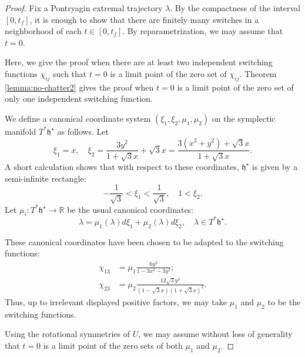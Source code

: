 \documentclass{article}
\theoremstyle{remark}
\newcommand{\ring}[1]{\mathbb{#1}}
\def\hstar{{\mathfrak h}^\star}
\begin{document}
\begin{proof} Fix a Pontryagin extremal trajectory $\lambda$.  By the
  compactness of the interval $[0,t_f]$, it is enough to show that
  there are finitely many switches in a neighborhood of each $t\in
  [0,t_f]$.  By reparametrization, we may assume that $t=0$.

  Here, we give the proof when there are at least two independent
  switching functions $\chi_{ij}$ such that $t=0$ is a limit point
  of the zero set of $\chi_{ij}$.  Theorem
  \ref{lemma:no-chatter2} gives the proof when $t=0$ is a limit
  point of the zero set of only one independent
  switching function.


We define a canonical coordinate system $(\xi_1,\xi_2,\mu_1,\mu_2)$ on
the symplectic manifold $T^*\hstar$ as follows.  Let
\[
\xi_1 = x,\quad \xi_2 =  \frac{3 y^2}{1 + \sqrt{3} x} + \sqrt{3} x = 
\frac{3 (x^2+y^2) + \sqrt{3} x}{1 + \sqrt{3} x}.
\]
A short calculation shows that with respect to these coordinates,
$\hstar$ is given by a semi-infinite rectangle:
\[
-\frac{1}{\sqrt{3}} < \xi_1 < \frac{1}{\sqrt{3}},\quad 1 < \xi_2.
\]
Let $\mu_i:T^*\hstar\to\ring{R}$ be the usual canonical coordinates:
\[
\lambda = \mu_1(\lambda) d\xi_1 + \mu_2(\lambda) d\xi_2,\quad
\lambda\in T^*\hstar.
\]

These canonical coordinates have been chosen to be adapted to the
switching functions:
\begin{align*}
\chi_{13} &= \mu_1 \frac{6 y^3}{1-3x^2 - 3y^2};\\
\chi_{23} &= \mu_2 \frac{12\sqrt{3}y^3}{(1-\sqrt{3} x)(1 + \sqrt{3} x)^2}.
\end{align*}
Thus, up to irrelevant displayed positive factors, we may take $\mu_1$ and
$\mu_2$ to be the switching functions.

Using the rotational symmetries of $U$, we may assume without loss
of generality that $t=0$ is a limit point of the zero sets of both
 $\mu_1$ and $\mu_2$.


\end{proof}
\end{document}

